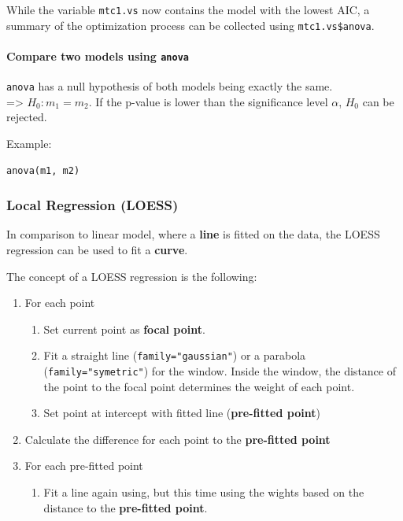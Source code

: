While the variable \lstinline{mtc1.vs} now contains the model with the lowest AIC, a summary of the optimization process can be collected using \lstinline{mtc1.vs$anova}.

\paragraph{Compare two models using \lstinline{anova}}
\lstinline{anova} has a null hypothesis of both models being exactly the same.\\
=> $H_0: m_1 = m_2$.
If the p-value is lower than the significance level $\alpha$, $H_0$ can be rejected.

Example:
\begin{lstlisting}
anova(m1, m2)
\end{lstlisting} 

\subsubsection{Local Regression (LOESS)}
In comparison to linear model, where a \textbf{line} is fitted on the data, the LOESS regression can be used to fit a \textbf{curve}.

The concept of a LOESS regression is the following:

\begin{enumerate}
	\tightlist
	\item For each point
	\begin{enumerate}
		\tightlist
		\item Set current point as \textbf{focal point}.
		\item Fit a straight line (\lstinline{family="gaussian"}) or a parabola (\lstinline{family="symetric"}) for the window. Inside the window, the distance of the point to the focal point determines the weight of each point.
		\item Set point at intercept with fitted line (\textbf{pre-fitted point})
	\end{enumerate}
	\item Calculate the difference for each point to the \textbf{pre-fitted point}
	\item For each pre-fitted point
	\begin{enumerate}
		\item Fit a line again using, but this time using the wights based on the distance to the \textbf{pre-fitted point}.
	\end{enumerate}
\end{enumerate}

